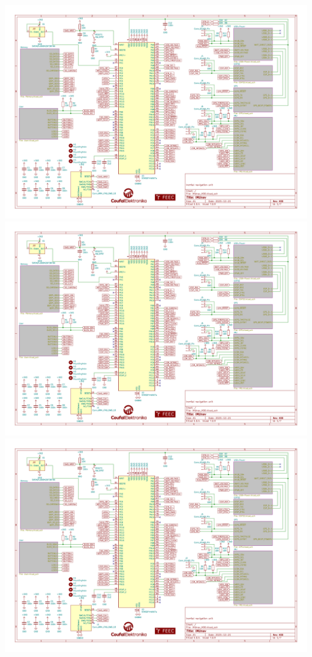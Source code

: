 \includegraphics[angle=90, page=2, width=\textwidth]{KiCad/schematic.pdf}
\includegraphics[angle=90, page=3, width=\textwidth]{KiCad/schematic.pdf}
\includegraphics[angle=90, page=4, width=\textwidth]{KiCad/schematic.pdf}

